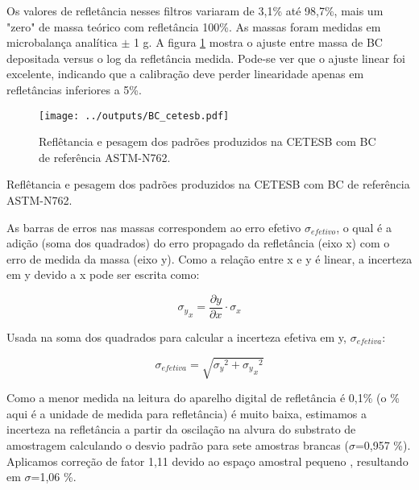 Os valores de refletância nesses filtros variaram de 3,1\% até 98,7\%, mais um 
"zero" de massa teórico com refletância 100\%. As massas foram medidas em 
microbalança analítica $\pm$ 1 g. A figura \ref{fig:bc_cetesb} mostra o ajuste 
entre massa de BC depositada versus o log da refletância medida. Pode-se ver 
que o ajuste linear foi excelente,
indicando que a calibração deve perder linearidade apenas em refletâncias 
inferiores a 5\%.

\begin{figure}[H]
	\centering
	\texttt{[image: ../outputs/BC\_cetesb.pdf]}
	\caption{Reflêtancia e pesagem dos padrões produzidos na CETESB com BC 
                 de referência ASTM-N762. \label{fig:bc_cetesb}}
\end{figure}

\newpage
\begin{table}[H]
	\centering
	\small
	\caption{Reflêtancia e pesagem dos padrões produzidos na CETESB com BC 
                 de referência ASTM-N762. \label{table:bc_cetesb}}
	

\end{table} 

As barras de erros nas massas correspondem ao erro efetivo $\sigma_{efetivo}$, 
o qual é a adição (soma dos quadrados) do erro propagado da refletância (eixo x)
com o erro de medida da massa (eixo y). Como a relação entre x e y é linear, 
a incerteza em y devido a x pode ser escrita como:

\begin{equation}
  {\sigma_y}_x = \frac{\partial y}{\partial x} \cdot \sigma_x
\end{equation} 

Usada na soma dos quadrados para calcular a incerteza efetiva em y, 
$\sigma_{efetiva}$: 

\begin{equation}
  \sigma_{efetiva} = \sqrt{{\sigma_y}^2 + {{\sigma_y}_x}^2}
\end{equation} 

Como a menor medida na leitura do aparelho digital de refletância é 0,1\%
(o \% aqui é a unidade de medida para refletância) é muito baixa, estimamos 
a incerteza na refletância a partir da oscilação na alvura do substrato de 
amostragem calculando o desvio padrão para sete amostras 
brancas ($\sigma$=0,957 \%). Aplicamos correção de fator 1,11 devido ao 
espaço amostral pequeno \citep{helene1981}, resultando em $\sigma$=1,06 \%.

